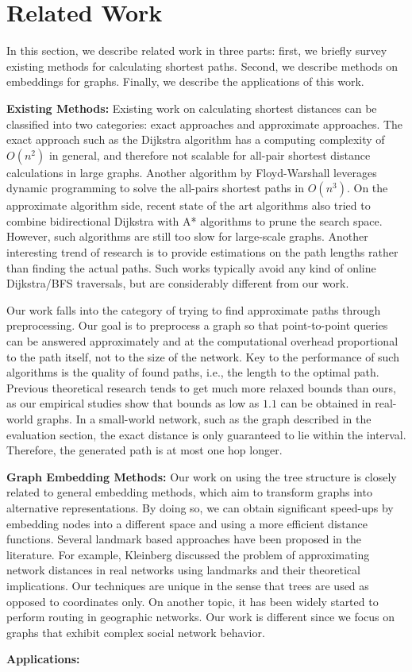 \section{Related Work}
\label{relatedwork}

In this section, we describe related work in three parts: first, we briefly survey existing methods for calculating shortest paths. Second, we describe methods on embeddings for graphs. Finally, we describe the applications of this work.

\textbf{Existing Methods:} Existing work on calculating shortest distances can be classified into two categories: exact approaches and approximate approaches.  The exact approach such as the Dijkstra algorithm has a computing complexity of $O(n^2)$ in general, and therefore not scalable for all-pair shortest distance calculations in large graphs. Another algorithm by Floyd-Warshall leverages dynamic programming to solve the all-pairs shortest paths in $O(n^3)$. On the approximate algorithm side, recent  state of the art algorithms also tried to combine bidirectional Dijkstra with A* algorithms to prune the search space. However, such algorithms are still too slow for large-scale graphs. Another interesting trend of research is to provide estimations on the path lengths rather than finding the actual paths. Such works typically avoid any kind of online Dijkstra/BFS traversals, but are considerably different from our work.

Our work falls into the category of trying to find approximate paths through preprocessing. Our goal is to preprocess a graph so that point-to-point queries can be answered approximately and at the computational overhead proportional to the path itself, not to the size of the network.  Key to the performance of such algorithms is the quality of found paths, i.e., the length to the optimal path. Previous theoretical research tends to get much more relaxed bounds than ours, as our empirical studies show that bounds as low as $1.1$ can be obtained in real-world graphs. In a small-world network, such as the graph described in the evaluation section, the exact distance is only guaranteed to lie within the interval. Therefore, the generated path is at most one hop longer.

\textbf{Graph Embedding Methods:} Our work on using the tree structure is closely related to general embedding methods, which aim to transform graphs into alternative representations. By doing so, we can obtain significant speed-ups
by embedding nodes into a different space and using a more efficient distance functions. Several landmark based approaches have been proposed in the literature. For example, Kleinberg discussed the problem of approximating network distances in real networks using landmarks and their theoretical implications. Our techniques are unique in the sense that trees are used as opposed to coordinates only. On another topic, it has been widely started to perform routing in geographic networks. Our work is different since we focus on graphs that exhibit complex social network behavior.

\textbf{Applications:} 
